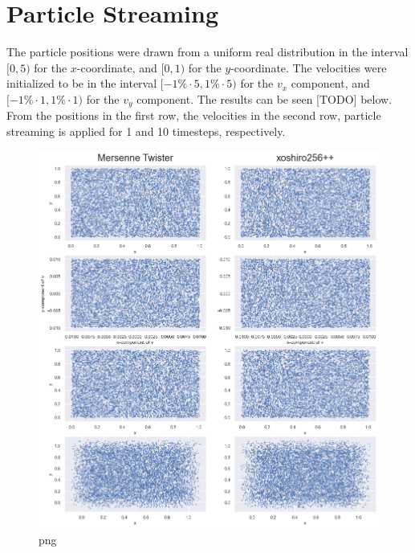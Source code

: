 \documentclass[
]{article}
\begin{document}
\hypertarget{particle-streaming}{%
\section{Particle Streaming}\label{particle-streaming}}

The particle positions were drawn from a uniform real distribution in
the interval \([0, 5)\) for the \(x\)-coordinate, and \([0, 1)\) for the
\(y\)-coordinate. The velocities were initialized to be in the interval
\([-1\% \cdot 5, 1\% \cdot 5)\) for the \(v_x\) component, and
\([-1\% \cdot 1, 1\% \cdot 1)\) for the \(v_y\) component. The results
can be seen {[}TODO{]} below. From the positions in the first row, the
velocities in the second row, particle streaming is applied for 1 and 10
timesteps, respectively.

\begin{figure}
\centering
\includegraphics{thesis_files/thesis_29_0.png}
\caption{png}
\end{figure}
\end{document}
